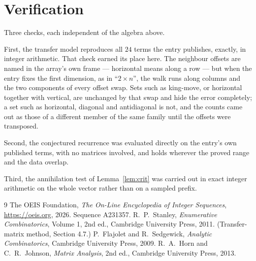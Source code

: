 \documentclass[11pt,a4paper]{article}
\theoremstyle{plain}
\theoremstyle{definition}
\begin{document}
\section{Verification}

Three checks, each independent of the algebra above.

First, the transfer model reproduces all $24$ terms the entry publishes, exactly, in
integer arithmetic. That check earned its place here. The neighbour offsets are named in the
array's own frame --- horizontal means along a row --- but when the entry fixes the first
dimension, as in ``$2\times n$'', the walk runs along columns and the two components of every
offset swap. Sets such as king-move, or horizontal together with vertical, are unchanged by
that swap and hide the error completely; a set such as horizontal, diagonal and antidiagonal
is not, and the counts came out as those of a different member of the same family until the
offsets were transposed.

Second, the conjectured recurrence was evaluated directly on the entry's own published terms,
with no matrices involved, and holds wherever the proved range and the data overlap.

Third, the annihilation test of Lemma~\ref{lem:crit} was carried out in exact integer
arithmetic on the whole vector rather than on a sampled prefix.

\begin{thebibliography}{9}
 The OEIS Foundation, \emph{The On-Line Encyclopedia of Integer
Sequences}, \url{https://oeis.org}, 2026. Sequence A231357.
 R.~P.~Stanley, \emph{Enumerative Combinatorics}, Volume 1, 2nd ed.,
Cambridge University Press, 2011. (Transfer-matrix method, Section 4.7.)
 P.~Flajolet and R.~Sedgewick, \emph{Analytic Combinatorics}, Cambridge
University Press, 2009.
 R.~A.~Horn and C.~R.~Johnson, \emph{Matrix Analysis}, 2nd ed., Cambridge
University Press, 2013.
\end{thebibliography}
\end{document}
